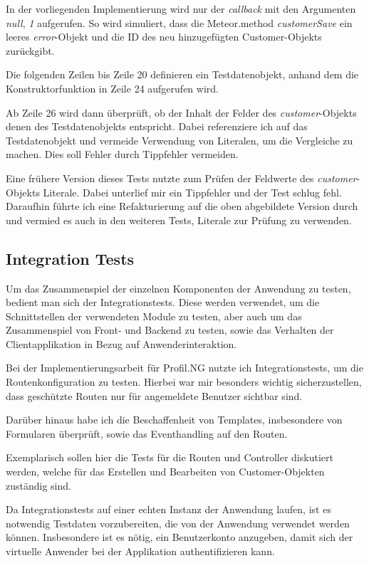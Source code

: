 In der vorliegenden Implementierung wird nur der \textit{callback} mit den
Argumenten \textit{null}, \textit{1} aufgerufen. So wird simuliert, dass die
Meteor.method \textit{customerSave} ein leeres \textit{error}-Objekt und die ID
des neu hinzugefügten Customer-Objekts zurückgibt.

Die folgenden Zeilen bis Zeile 20 definieren ein Testdatenobjekt, anhand dem die
Konstruktorfunktion in Zeile 24 aufgerufen wird.

Ab Zeile 26 wird dann überprüft, ob der Inhalt der Felder des
\textit{customer}-Objekts denen des Testdatenobjekts entspricht. Dabei
referenziere ich auf das Testdatenobjekt und vermeide Verwendung von Literalen,
um die Vergleiche zu machen. Dies soll Fehler durch Tippfehler vermeiden.

Eine frühere Version dieses Tests nutzte zum Prüfen der Feldwerte des
\textit{customer}-Objekts Literale. Dabei unterlief mir ein Tippfehler und der
Test schlug fehl. Daraufhin führte ich eine Refakturierung auf die oben
abgebildete Version durch und vermied es auch in den weiteren Tests, Literale
zur Prüfung zu verwenden.

\subsection{Integration Tests}

Um das Zusammenspiel der einzelnen Komponenten der Anwendung zu testen, bedient
man sich der Integrationstests. Diese werden verwendet, um die Schnittstellen
der verwendeten Module zu testen, aber auch um das Zusammenspiel von Front- und
Backend zu testen, sowie das Verhalten der Clientapplikation in Bezug auf
Anwenderinteraktion.

Bei der Implementierungsarbeit für Profil.NG nutzte ich Integrationstests, um die
Routenkonfiguration zu testen. Hierbei war mir besonders wichtig sicherzustellen,
dass geschützte Routen nur für angemeldete Benutzer sichtbar sind.

Darüber hinaus habe ich die Beschaffenheit von Templates, insbesondere von
Formularen überprüft, sowie das Eventhandling auf den Routen.

Exemplarisch sollen hier die Tests für die Routen und Controller diskutiert
werden, welche für das Erstellen und Bearbeiten von Customer-Objekten zuständig
sind.

Da Integrationstests auf einer echten Instanz der Anwendung laufen, ist es
notwendig Testdaten vorzubereiten, die von der Anwendung verwendet werden
können. Insbesondere ist es nötig, ein Benutzerkonto anzugeben, damit sich der
virtuelle Anwender bei der Applikation authentifizieren kann.

